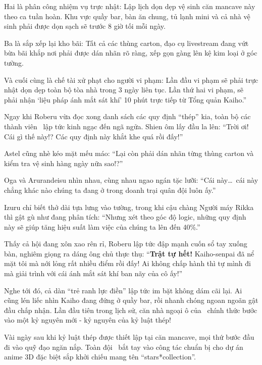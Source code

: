 \documentclass[../main.tex]{subfiles}
\begin{document}
Hai là phân công nhiệm vụ trực nhật: Lập lịch dọn dẹp vệ sinh căn mancave này theo ca tuần hoàn. Khu vực quầy bar, bàn ăn chung, tủ lạnh mini và cả nhà vệ sinh phải được dọn sạch sẽ trước 8 giờ tối mỗi ngày.

Ba là sắp xếp lại kho bãi: Tất cả các thùng carton, đạo cụ livestream đang vứt bừa bãi khắp nơi phải được dán nhãn rõ ràng, xếp gọn gàng lên kệ kim loại ở góc tường.

Và cuối cùng là chế tài xử phạt cho người vi phạm: Lần đầu vi phạm sẽ phải trực nhật dọn dẹp toàn bộ tòa nhà trong 3 ngày liên tục. Lần thứ hai vi phạm, sẽ phải nhận `liệu pháp ánh mắt sát khí' 10 phút trực tiếp từ Tổng quản Kaiho.''

Ngay khi Roberu vừa đọc xong danh sách các quy định ``thép'' kia, toàn bộ các thành viên \hls\ lập tức kinh ngạc đến ngã ngửa. Shien ôm lấy đầu la lên: ``Trời ơi! Cái gì thế này!? Các quy định này khắt khe quá rồi đấy!''

Astel cũng nhè kéo mặt mếu máo: ``Lại còn phải dán nhãn từng thùng carton và kiểm tra vệ sinh hàng ngày nữa sao!?''

Oga và Arurandeisu nhìn nhau, cùng nhau ngao ngán tặc lưỡi: ``Cái này\dots\ cái này chẳng khác nào chúng ta đang ở trong doanh trại quân đội luôn ấy.''

Izuru chỉ biết thở dài tựa lưng vào tường, trong khi cậu chàng Người máy Rikka thì gật gù như đang phân tích: ``Nhưng xét theo góc độ logic, những quy định này sẽ giúp tăng hiệu suất làm việc của chúng ta lên đến 40\%.''

Thấy cả hội đang xôn xao rên rỉ, Roberu lập tức đập mạnh cuốn sổ tay xuống bàn, nghiêm giọng ra dáng ông chủ thực thụ: ``\textbf{Trật tự hết!} Kaiho-senpai đã nể mặt tôi mà nới lỏng rất nhiều điểm rồi đấy! Ai không chấp hành thì tự mình đi mà giải trình với cái ánh mắt sát khí ban nãy của cô ấy!''

Nghe tới đó, cả dàn ``trẻ ranh lực điền'' lập tức im bặt không dám cãi lại. Ai cũng lén liếc nhìn Kaiho đang đứng ở quầy bar, rồi nhanh chóng ngoan ngoãn gật đầu chấp nhận. Lần đầu tiên trong lịch sử, căn nhà ngoại ô của \hls\ chính thức bước vào một kỷ nguyên mới - kỷ nguyên của kỷ luật thép!

\omk

Vài ngày sau khi kỷ luật thép được thiết lập tại căn mancave, mọi thứ bước đầu đi vào quỹ đạo ngăn nắp. Toàn đội \hls\ bắt tay vào công tác chuẩn bị cho dự án anime 3D đặc biệt sắp khởi chiếu mang tên ``stars*collection''.
\end{document}
